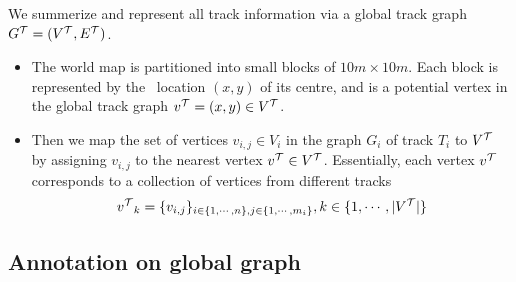 We summerize and represent all track information via a global track graph ${G^{\mathcal{T}}}=({V^{\mathcal{T}}},{E^{\mathcal{T}}})$.
\begin{itemize}
	\item The world map is partitioned into small blocks of $10m\times10m$. Each block is represented by the \gps\ location $(x,y)$ of its centre, and is a potential vertex in the global track graph ${v^{\mathcal{T}}}=(x,y)\in{V^{\mathcal{T}}}$. 
	\item Then we map the set of vertices $v_{i,j}\in V_i$ in the graph $G_i$ of track $T_i$ to ${V^{\mathcal{T}}}$ by assigning $v_{i,j}$ to the nearest vertex ${v^{\mathcal{T}}}\in{V^{\mathcal{T}}}$. Essentially, each vertex ${v^{\mathcal{T}}}$ corresponds to a collection of vertices from different tracks
	\begin{align*}
		{v^{\mathcal{T}}}_k = \{v_{i,j}\}_{i\in\{1,\cdots,n\}, j\in\{1,\cdots,m_i\}}, k\in\{1,\cdots,|{V^{\mathcal{T}}}|\}
	\end{align*}
\end{itemize}




\subsection{Annotation on global graph}




